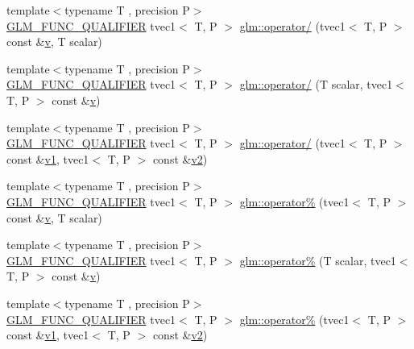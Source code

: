 \begin{DoxyCompactItemize}
\item 
{\footnotesize template$<$typename T , precision P$>$ }\\\mbox{\hyperlink{setup_8hpp_a33fdea6f91c5f834105f7415e2a64407}{G\+L\+M\+\_\+\+F\+U\+N\+C\+\_\+\+Q\+U\+A\+L\+I\+F\+I\+ER}} tvec1$<$ T, P $>$ \mbox{\hyperlink{namespaceglm_a8a223e153f2fd9909acf20517e4b0c56}{glm\+::operator/}} (tvec1$<$ T, P $>$ const \&\mbox{\hyperlink{glad_8h_a14cfbe2fc2234f5504618905b69d1e06}{v}}, T scalar)
\item 
{\footnotesize template$<$typename T , precision P$>$ }\\\mbox{\hyperlink{setup_8hpp_a33fdea6f91c5f834105f7415e2a64407}{G\+L\+M\+\_\+\+F\+U\+N\+C\+\_\+\+Q\+U\+A\+L\+I\+F\+I\+ER}} tvec1$<$ T, P $>$ \mbox{\hyperlink{namespaceglm_adc13dc68b3d7dc9687fab144ea89519f}{glm\+::operator/}} (T scalar, tvec1$<$ T, P $>$ const \&\mbox{\hyperlink{glad_8h_a14cfbe2fc2234f5504618905b69d1e06}{v}})
\item 
{\footnotesize template$<$typename T , precision P$>$ }\\\mbox{\hyperlink{setup_8hpp_a33fdea6f91c5f834105f7415e2a64407}{G\+L\+M\+\_\+\+F\+U\+N\+C\+\_\+\+Q\+U\+A\+L\+I\+F\+I\+ER}} tvec1$<$ T, P $>$ \mbox{\hyperlink{namespaceglm_adfaadf561e7e396410919ec1b2d55c46}{glm\+::operator/}} (tvec1$<$ T, P $>$ const \&\mbox{\hyperlink{glad_8h_a0779c3b73f9aa3a0ac5b0139b5d291d9}{v1}}, tvec1$<$ T, P $>$ const \&\mbox{\hyperlink{glad_8h_a9a09a1837922b2b806f4589096a52049}{v2}})
\item 
{\footnotesize template$<$typename T , precision P$>$ }\\\mbox{\hyperlink{setup_8hpp_a33fdea6f91c5f834105f7415e2a64407}{G\+L\+M\+\_\+\+F\+U\+N\+C\+\_\+\+Q\+U\+A\+L\+I\+F\+I\+ER}} tvec1$<$ T, P $>$ \mbox{\hyperlink{namespaceglm_a415cbef7b65530f60c9240859abc0f14}{glm\+::operator\%}} (tvec1$<$ T, P $>$ const \&\mbox{\hyperlink{glad_8h_a14cfbe2fc2234f5504618905b69d1e06}{v}}, T scalar)
\item 
{\footnotesize template$<$typename T , precision P$>$ }\\\mbox{\hyperlink{setup_8hpp_a33fdea6f91c5f834105f7415e2a64407}{G\+L\+M\+\_\+\+F\+U\+N\+C\+\_\+\+Q\+U\+A\+L\+I\+F\+I\+ER}} tvec1$<$ T, P $>$ \mbox{\hyperlink{namespaceglm_ac34ec6006ae7fceb9fdfbf9d8633d2d9}{glm\+::operator\%}} (T scalar, tvec1$<$ T, P $>$ const \&\mbox{\hyperlink{glad_8h_a14cfbe2fc2234f5504618905b69d1e06}{v}})
\item 
{\footnotesize template$<$typename T , precision P$>$ }\\\mbox{\hyperlink{setup_8hpp_a33fdea6f91c5f834105f7415e2a64407}{G\+L\+M\+\_\+\+F\+U\+N\+C\+\_\+\+Q\+U\+A\+L\+I\+F\+I\+ER}} tvec1$<$ T, P $>$ \mbox{\hyperlink{namespaceglm_a2de72c33a685ffa2e78ebad4ae9f4e2b}{glm\+::operator\%}} (tvec1$<$ T, P $>$ const \&\mbox{\hyperlink{glad_8h_a0779c3b73f9aa3a0ac5b0139b5d291d9}{v1}}, tvec1$<$ T, P $>$ const \&\mbox{\hyperlink{glad_8h_a9a09a1837922b2b806f4589096a52049}{v2}})

\end{DoxyCompactItemize}
